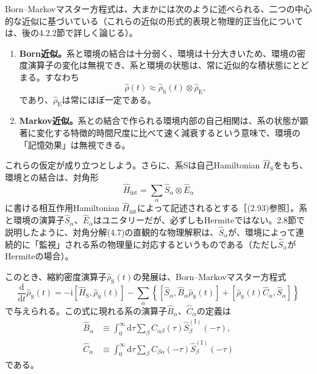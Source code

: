\hypertarget{srcpage:156}{}\label{srcpage:156}
Born--Markovマスター方程式は、大まかには次のように述べられる、二つの中心的な近似に基づいている（これらの近似の形式的表現と物理的正当化については、後の4.2.2節で詳しく論じる）。
\begin{enumerate}
\item \textbf{Born近似。}系と環境の結合は十分弱く、環境は十分大きいため、環境の密度演算子の変化は無視でき、系と環境の状態は、常に近似的な積状態にとどまる。すなわち
\begin{equation}
\hat\rho(t)\approx\hat\rho_{\mathrm S}(t)\otimes\hat\rho_{\mathrm E},
\tag{4.6}
\end{equation}
であり、$\hat\rho_{\mathrm E}$は常にほぼ一定である。
\item \textbf{Markov近似。}系との結合で作られる環境内部の自己相関は、系の状態が顕著に変化する特徴的時間尺度に比べて速く減衰するという意味で、環境の「記憶効果」は無視できる。
\end{enumerate}
これらの仮定が成り立つとしよう。さらに、系Sは自己Hamiltonian $\hat H_{\mathrm S}$をもち、環境との結合は、対角形
\begin{equation}
\hat H_{\mathrm{int}}=\sum_\alpha\hat S_\alpha\otimes\hat E_\alpha
\tag{4.7}
\end{equation}
に書ける相互作用Hamiltonian $\hat H_{\mathrm{int}}$によって記述されるとする［(2.93)参照］。系と環境の演算子$\hat S_\alpha$、$\hat E_\alpha$はユニタリーだが、必ずしもHermiteではない。2.8節で説明したように、対角分解(4.7)の直観的な物理解釈は、$\hat S_\alpha$が、環境によって連続的に「監視」される系の物理量に対応するというものである（ただし$\hat S_\alpha$がHermiteの場合）。

このとき、縮約密度演算子$\hat\rho_{\mathrm S}(t)$の発展は、Born--Markovマスター方程式
\begin{equation}
\frac{\mathrm d}{\mathrm dt}\hat\rho_{\mathrm S}(t)=-\mathrm i[\hat H_{\mathrm S},\hat\rho_{\mathrm S}(t)]
-\sum_\alpha\left\{[\hat S_\alpha,\hat B_\alpha\hat\rho_{\mathrm S}(t)]+[\hat\rho_{\mathrm S}(t)\hat C_\alpha,\hat S_\alpha]\right\}
\tag{4.8}
\end{equation}
で与えられる。この式に現れる系の演算子$\hat B_\alpha$、$\hat C_\alpha$の定義は
\begin{align}
\hat B_\alpha&\equiv\int_0^\infty\mathrm d\tau\sum_\beta C_{\alpha\beta}(\tau)\hat S_\beta^{(\mathrm I)}(-\tau),\tag{4.9a}\\
\hat C_\alpha&\equiv\int_0^\infty\mathrm d\tau\sum_\beta C_{\beta\alpha}(-\tau)\hat S_\beta^{(\mathrm I)}(-\tau)\tag{4.9b}
\end{align}
である。

